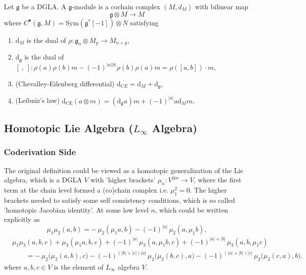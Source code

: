 \documentclass[10pt]{article}
\begin{document}
\begin{definition}
  Let $\mathfrak{g}$ be a DGLA. A $\mathfrak{g}$-module is a cochain complex $(M, d_M)$ with bilinear map
  \begin{equation*}
    \mathfrak{g} \otimes M \rightarrow M
  \end{equation*}
  where $ C^{\bullet}(\mathfrak{g}, M) = \mathrm{Sym}\left( \mathfrak{g}^{*}[-1] \right) \otimes N$ satisfying
  \begin{enumerate}[(1)]
    \item $ \mathrm{d} _{M}$ is the dual of $\rho: \mathfrak{g}_n \otimes M_p \rightarrow M_{n+p}$,
    \item $ \mathrm{d} _{\mathfrak{g}}$ is the dual of $[~,~]: \rho(a) \rho(b) m - (-1)^{|a||b|} \rho(b) \rho(a) m = \rho([a, b]) \cdot m$,
    \item (Chevalley-Eilenberg differential) $ \mathrm{d} _{CE} = \mathrm{d} _{M} + \mathrm{d} _{\mathfrak{g}}$,
    \item (Leibniz's law) $\mathrm{d}_\mathrm{CE}(a \otimes m) = (\mathrm{d}_{\mathfrak{g}} a) m + (-1)^{|a|} a \mathrm{d}_M m$,
  \end{enumerate}
\end{definition}

\subsection{\texorpdfstring{Homotopic Lie Algebra ($L_{\infty}$ Algebra)}{Homotopic Lie Algebra (L-infinity Algebra)}}

\subsubsection{Coderivation Side}

The original definition could be viewed as a homotopic generalization of the Lie algebra, which is a DGLA $ V$  with 'higher brackets' $ \mu_{n}: V^{\otimes n} \rightarrow V$, where the first term at the chain level formed a (co)chain complex i.e. $ \mu_1^{2} = 0$.
The higher brackets needed to satisfy some self consistency conditions, which is so called 'homotopic Jacobian identity'.
At some low level $ n$, which could be written explicitly as
\begin{equation*}
  \mu_1 \mu_2(a,b)
  = -\,\mu_2(\mu_1 a, b)-(-1)^{|a|}\,\mu_2(a, \mu_1 b),
\end{equation*}
\begin{equation*}
  \begin{aligned}
    &\mu_1 \mu_3(a,b,c)
    + \mu_3(\mu_1 a, b, c)
    + (-1)^{|a|}\,\mu_3(a, \mu_1 b, c)
    + (-1)^{|a|+|b|}\,\mu_3(a, b, \mu_1 c)\\
    &\qquad
    = -\,\mu_2\bigl(\mu_2(a,b),c\bigr)
    - (-1)^{(|b|+|c|)|a|}\,\mu_2\bigl(\mu_2(b,c),a\bigr)
    - (-1)^{(|a|+|b|)|c|}\,\mu_2\bigl(\mu_2(c,a),b\bigr).
  \end{aligned}
\end{equation*}
where $ a, b, c \in V$ is the element of $ L_\infty$ algebra $ V$.
\end{document}
